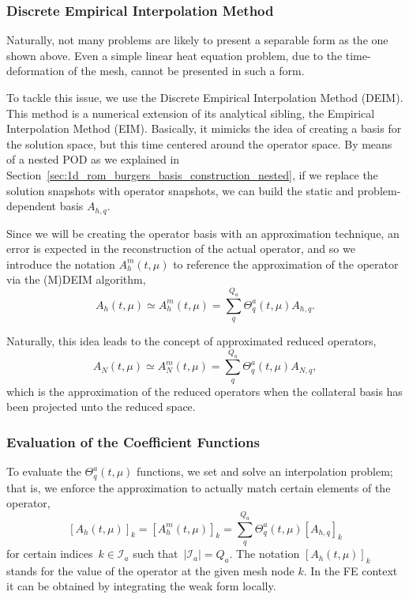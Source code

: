 \documentclass[../../thesis.tex]{subfiles}
\begin{document}
\subsubsection{Discrete Empirical Interpolation Method}
Naturally, not many problems are likely to present a separable form as the one shown above.
Even a simple linear heat equation problem, due to the time-deformation of the mesh, cannot be presented in such a form. 

To tackle this issue, we use the Discrete Empirical Interpolation Method (DEIM).
This method is a numerical extension of its analytical sibling, the Empirical Interpolation Method (EIM).
Basically, it mimicks the idea of creating a basis for the solution space, but this time centered around the operator space.
By means of a nested POD as we explained in Section~\ref{sec:1d_rom_burgers_basis_construction_nested}, 
if we replace the solution snapshots with operator snapshots, 
we can build the static and problem-dependent basis $A_{h,q}$.

Since we will be creating the operator basis with an approximation technique, 
an error is expected in the reconstruction of the actual operator, 
and so we introduce the notation $A_h^m(t, \mu)$ to reference the approximation of the operator via the (M)DEIM algorithm,
\begin{equation}
    \label{eq:1d_rom_burgers_system_approximation}
    A_h(t, \mu) \simeq A_h^m(t, \mu) = \sum_q^{Q_a} \Theta_q^a(t, \mu) A_{h,q}.
\end{equation}

Naturally, this idea leads to the concept of approximated reduced operators,
\begin{equation}
    A_N(t, \mu) \simeq A_N^m(t, \mu) = \sum_q^{Q_a} \Theta_q^a(t, \mu) A_{N,q},
\end{equation}
which is the approximation of the reduced operators when the collateral basis 
has been projected unto the reduced space.

\subsubsection{Evaluation of the Coefficient Functions}
To evaluate the $\Theta_q^a(t, \mu)$ functions, we set and solve an interpolation problem;
that is, 
we enforce the approximation to actually match certain elements of the operator, 
\begin{equation}
    \label{eq:1d_rom_burgers_interpolation_problem}
    [A_h(t, \mu)]_{k} = [A_h^m(t, \mu)]_{k} = \sum_q^{Q_a} \Theta_q^a(t, \mu) [A_{h, q}]_{k}
\end{equation}
for certain indices~$k \in \mathcal{I}_a$ such that~$\left|\mathcal{I}_a\right| = Q_a$.
The notation $[A_h(t, \mu)]_{k}$ stands for the value of the operator at the given mesh node $k$.
In the FE context it can be obtained by integrating the weak form locally.
\end{document}
